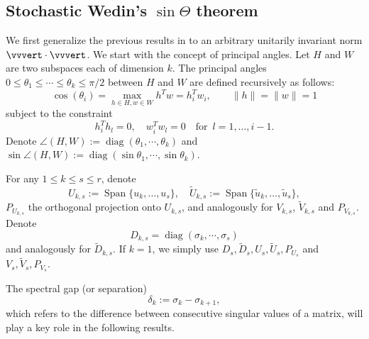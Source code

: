 \documentclass[reqno]{amsart}
\DeclareMathOperator{\diag}{diag}
\DeclareMathOperator{\Span}{Span}
\theoremstyle{plain}
\theoremstyle{definition}
\begin{document}
\subsection{Stochastic Wedin's $\sin\Theta$ theorem}\label{sec:wdk}
We first generalize the previous results in \cite{OVW2, OVW22} to an arbitrary unitarily invariant norm $\vvvert \cdot \vvvert$.  We start with the concept of principal angles. Let $H$ and $W$ are two subspaces each of dimension $k$. The principal angles $0\le \theta_1\le \cdots \le \theta_k\le {\pi}/{2}$  between $H$ and $W$ are defined recursively as follows:
\begin{equation*}
\cos (\theta_i) = \max_{h\in H, w\in W} h^T w =h_i^T w_i, \qquad \|h\|=\|w\|=1
\end{equation*}
subject to the constraint
$$ h_i^T h_l=0, \quad w_i^T w_l =0\quad \text{for } \,l=1,\ldots,i-1.$$
Denote  $\angle (H,W) := \diag(\theta_1, \cdots , \theta_k)$ and $\sin\angle (H,W)  := \diag(\sin\theta_1, \cdots , \sin\theta_k)$. 

For any $1\le k \le s \leq r$, denote
\[ U_{k,s} := \Span\{u_k,\ldots, u_s \}, \quad \widetilde U_{k,s} := \Span\{\widetilde u_k,\ldots, \widetilde u_s \}, \]
$P_{U_{k,s}}$ the orthogonal projection onto $U_{k,s}$, and analogously for $V_{k,s}$,  $\widetilde V_{k,s}$ and $P_{V_{k,s}}$. Denote $$D_{k,s}=\diag(\sigma_{k},\cdots, \sigma_s)$$ and analogously for $\widetilde D_{k,s}$. If $k=1$, we simply use $D_s, \widetilde D_s, U_s, \widetilde U_{s}, P_{U_{s}}$ and $V_s, \widetilde V_{s}, P_{V_{s}}$.

The spectral gap (or separation) $$\delta_k:=\sigma_k-\sigma_{k+1},$$ which refers to the difference between consecutive singular values of a matrix, will play a key role in the following results. 
\end{document}
